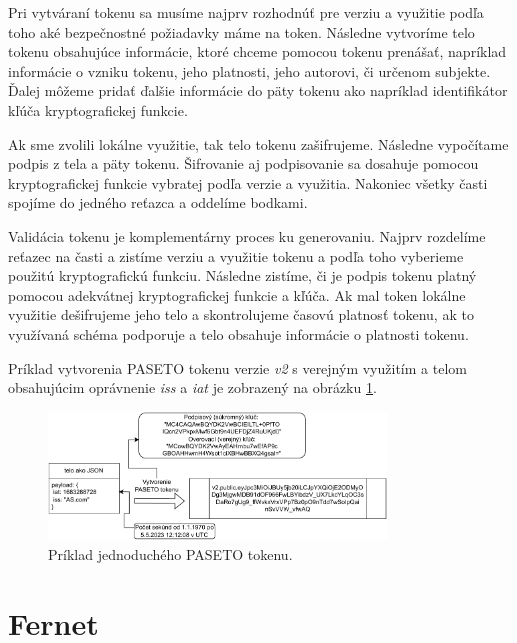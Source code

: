 Pri vytváraní tokenu sa musíme najprv rozhodnúť pre verziu a využitie podľa toho aké bezpečnostné požiadavky máme na token. Následne vytvoríme telo tokenu obsahujúce informácie, ktoré chceme pomocou tokenu prenášať, napríklad informácie o vzniku tokenu, jeho platnosti, jeho autorovi, či určenom subjekte. Ďalej môžeme pridať ďalšie informácie do päty tokenu ako napríklad identifikátor kľúča kryptografickej funkcie. 

Ak sme zvolili lokálne využitie, tak telo tokenu zašifrujeme. Následne vypočítame podpis z tela a päty tokenu. Šifrovanie aj podpisovanie sa dosahuje pomocou kryptografickej funkcie vybratej podľa verzie a využitia. Nakoniec všetky časti spojíme do jedného reťazca a oddelíme bodkami.

Validácia tokenu je komplementárny proces ku generovaniu. Najprv rozdelíme reťazec na časti a zistíme verziu a využitie tokenu a podľa toho vyberieme použitú kryptografickú funkciu. Následne zistíme, či je podpis tokenu platný pomocou adekvátnej kryptografickej funkcie a kľúča. Ak mal token lokálne využitie dešifrujeme jeho telo a skontrolujeme časovú platnosť tokenu, ak to využívaná schéma podporuje a telo obsahuje informácie o platnosti tokenu.

Príklad vytvorenia PASETO tokenu verzie \textit{v2} s verejným využitím a telom obsahujúcim oprávnenie \textit{iss} a \textit{iat} je zobrazený na obrázku \ref{fig:paseto_token}.

\begin{figure}
    \centerline{\includegraphics[width=0.8\textwidth]{images/paseto_token}}
    \caption[PASETO token]{Príklad jednoduchého PASETO tokenu.}
    \label{fig:paseto_token}
\end{figure}

\section{Fernet}

